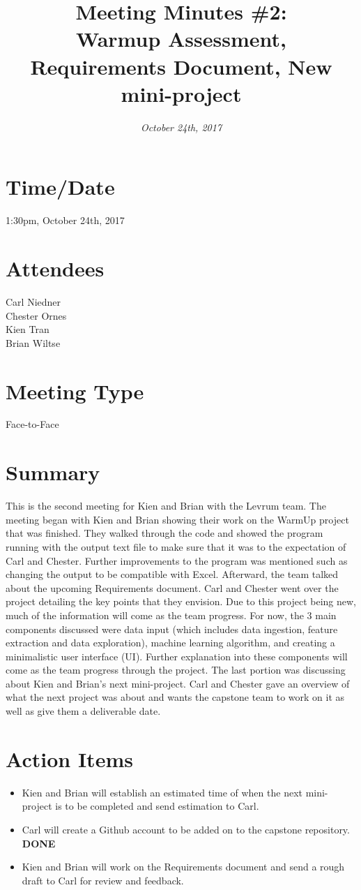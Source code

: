 \documentclass[10pt, onecolumn, draftclsnofoot, letterpaper, compsoc]{IEEEtran}
\title{Meeting Minutes \#2:\\ Warmup Assessment, Requirements Document, New mini-project}
\author{
	\textit{October 24th, 2017}}
\begin{document}
\maketitle
\section{Time/Date}
1:30pm, October 24th, 2017
\section{Attendees}
Carl Niedner\\
Chester Ornes\\
Kien Tran\\
Brian Wiltse\\
\section{Meeting Type}
Face-to-Face
\section{Summary}
This is the second meeting for Kien and Brian with the Levrum team. 
The meeting began with Kien and Brian showing their work on the WarmUp project that was finished. 
They walked through the code and showed the program running with the output text file to make sure that it was to the expectation of Carl and Chester. 
Further improvements to the program was mentioned such as changing the output to be compatible with Excel. 
Afterward, the team talked about the upcoming Requirements document. 
Carl and Chester went over the project detailing the key points that they envision. 
Due to this project being new, much of the information will come as the team progress. 
For now, the 3 main components discussed were data input (which includes data ingestion, feature extraction and data exploration), machine learning algorithm, and creating a minimalistic user interface (UI). 
Further explanation into these components will come as the team progress through the project. 
The last portion was discussing about Kien and Brian's next mini-project. 
Carl and Chester gave an overview of what the next project was about and wants the capstone team to work on it as well as give them a deliverable date.
\section{Action Items}
    \begin{itemize}
        \item Kien and Brian will establish an estimated time of when the next mini-project is to be completed and send estimation to Carl.
        \item Carl will create a Github account to be added on to the capstone repository. \textbf{DONE}
        \item Kien and Brian will work on the Requirements document and send a rough draft to Carl for review and feedback.
    \end{itemize}
\end{document}
